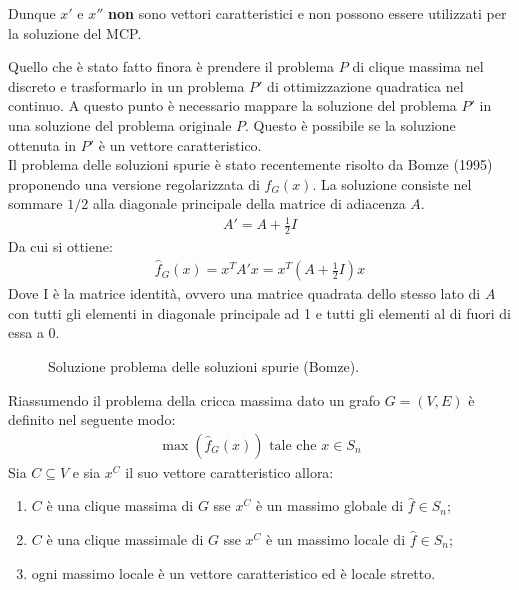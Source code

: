Dunque $x'$ e $x''$ \textbf{non} sono vettori caratteristici e non possono essere utilizzati per la soluzione del MCP.

\newpage

Quello che è stato fatto finora è prendere il problema $P$ di clique massima nel discreto e trasformarlo in un problema $P'$ di ottimizzazione quadratica nel continuo. A questo punto è necessario mappare la soluzione del problema $P'$ in una soluzione del problema originale $P$.  Questo è possibile se la soluzione ottenuta in $P'$ è un vettore caratteristico.\\

Il problema delle soluzioni spurie è stato recentemente risolto da Bomze (1995) proponendo una versione regolarizzata di $f_G(x)$. La soluzione consiste nel sommare $1/2$ alla diagonale principale della matrice di adiacenza $A$.
\begin{align*}
    A' = A + \frac{1}{2} I
\end{align*}
Da cui si ottiene:
\begin{align*}
    \hat{f}_G(x) = x^T A' x = x^T \left( A + \frac{1}{2} I \right) x 
\end{align*}
Dove I è la matrice identità, ovvero una matrice quadrata dello stesso lato di $A$ con tutti gli elementi in diagonale principale ad 1 e tutti gli elementi al di fuori di essa a 0.\\


\begin{figure}[h!]
    \centering
    \caption{Soluzione problema delle soluzioni spurie (Bomze).}
\end{figure}

Riassumendo il problema della cricca massima dato un grafo $G = (V, E)$ è definito nel seguente modo:
\begin{align*}
	\max(\hat{f}_G(x)) \text{ tale che } x \in S_n
\end{align*}
Sia $C \subseteq V$ e sia $x^C$ il suo vettore caratteristico allora:
\begin{enumerate}
	\item $C$ è una clique massima di $G$ sse $x^C$ è un massimo globale di $\hat{f} \in S_n$;
	\item $C$ è una clique massimale di $G$ sse $x^C$ è un massimo locale di $\hat{f} \in S_n$;
	\item ogni massimo locale è un vettore caratteristico ed è locale stretto. 
\end{enumerate}

